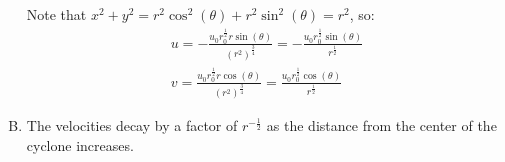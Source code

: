 \documentclass[11pt,a4paper,margin=1in]{article}
\begin{document}
\begin{enumerate}[A.]
    Note that $x^2 + y^2 = r^2\cos^2(\theta) + r^2\sin^2(\theta) = r^2$, so:
    \begin{gather*}
        u = -\frac{u_0r_0^{\frac{1}{2}}r\sin(\theta)}{(r^2)^{\frac{3}{4}}} = 
            -\frac{u_0r_0^{\frac{1}{2}}\sin(\theta)}{r^{\frac{1}{2}}}\\
        v = \frac{u_0r_0^{\frac{1}{2}}r\cos(\theta)}{(r^2)^{\frac{3}{4}}} =
            \frac{u_0r_0^{\frac{1}{2}}\cos(\theta)}{r^{\frac{1}{2}}}
    \end{gather*} 
    \item 
        The velocities decay by a factor of $r^{-\frac{1}{2}}$ as the distance 
        from the center of the cyclone increases. 
\end{enumerate}
\end{document}
